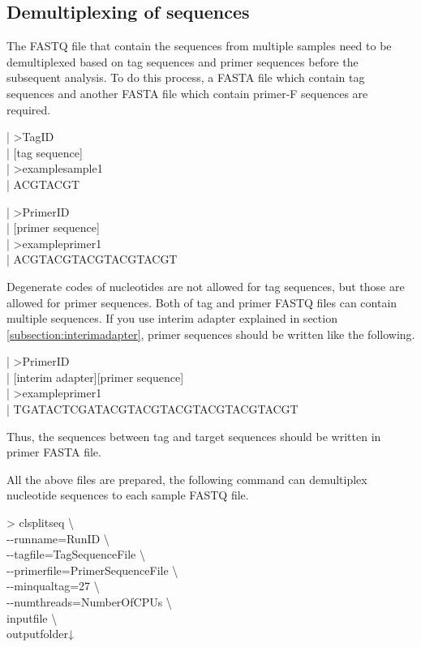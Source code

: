 \documentclass[titlepage,10pt,a4paper,english]{jsbook}
\newenvironment{content}{\begin{shaded}\vspace{-1em}\raggedright\ttfamily\footnotesize\setlength{\baselineskip}{1.4em}}{\end{shaded}\vspace{-1em}}
\newenvironment{cmd}{\begin{oframed}\raggedright\ttfamily\footnotesize\setlength{\baselineskip}{1.4em}}{\end{oframed}\vspace{-1em}}
\begin{document}
\subsection{Demultiplexing of sequences}

The FASTQ file that contain the sequences from multiple samples need to be demultiplexed based on tag sequences and primer sequences before the subsequent analysis.
To do this process, a FASTA file which contain tag sequences and another FASTA file which contain primer-F sequences are required.

\begin{content}
| {\textgreater}TagID\\
| [tag sequence]\\
| {\textgreater}examplesample1\\
| ACGTACGT
\end{content}

\begin{content}
| {\textgreater}PrimerID\\
| [primer sequence]\\
| {\textgreater}exampleprimer1\\
| ACGTACGTACGTACGTACGT
\end{content}

Degenerate codes of nucleotides are not allowed for tag sequences, but those are allowed for primer sequences.
Both of tag and primer FASTQ files can contain multiple sequences.
If you use interim adapter explained in section \ref{subsection:interimadapter}, primer sequences should be written like the following.

\begin{content}
| {\textgreater}PrimerID\\
| [interim adapter][primer sequence]\\
| {\textgreater}exampleprimer1\\
| TGATACTCGATACGTACGTACGTACGTACGTACGT
\end{content}

Thus, the sequences between tag and target sequences should be written in primer FASTA file.

All the above files are prepared, the following command can demultiplex nucleotide sequences to each sample FASTQ file.

\begin{cmd}
{\textgreater} clsplitseq {\textbackslash}\\
{-}{-}runname=RunID {\textbackslash}\\
{-}{-}tagfile=TagSequenceFile {\textbackslash}\\
{-}{-}primerfile=PrimerSequenceFile {\textbackslash}\\
{-}{-}minqualtag=27 {\textbackslash}\\
{-}{-}numthreads=NumberOfCPUs {\textbackslash}\\
inputfile {\textbackslash}\\
outputfolder↓
\end{cmd}
\end{document}
